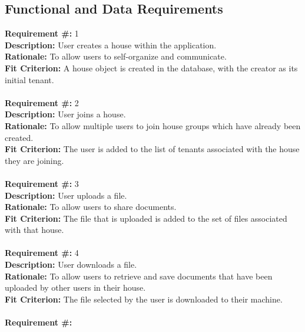 \documentclass[12pt]{article}
\begin{document}
\subsection{Functional and Data Requirements}
\textbf{Requirement \#:} 1 
       \\
      \textbf{Description:} User creates a house within the application. \\
      \textbf{Rationale:} To allow users to self-organize and communicate. \\
      \textbf{Fit Criterion:} A house object is created in the database, with
      the creator as its initial tenant. \\ \\    
\textbf{Requirement \#:} 2 
       \\
      \textbf{Description:} User joins a house. \\
      \textbf{Rationale:} To allow multiple users to join house groups which
      have already been created. \\
      \textbf{Fit Criterion:} The user is added to the list of tenants
      associated with the house they are joining. \\ \\
\textbf{Requirement \#:} 3 
       \\
      \textbf{Description:} User uploads a file. \\
      \textbf{Rationale:} To allow users to share documents. \\
      \textbf{Fit Criterion:} The file that is uploaded is added to the set of
      files associated with that house. \\ \\
\textbf{Requirement \#:} 4
       \\
      \textbf{Description:} User downloads a file. \\
      \textbf{Rationale:} To allow users to retrieve and save documents that 
have
      been uploaded by other users in their house. \\
      \textbf{Fit Criterion:} The file selected by the user is downloaded to
      their machine. \\ \\
\textbf{Requirement \#:} 
\end{document}

